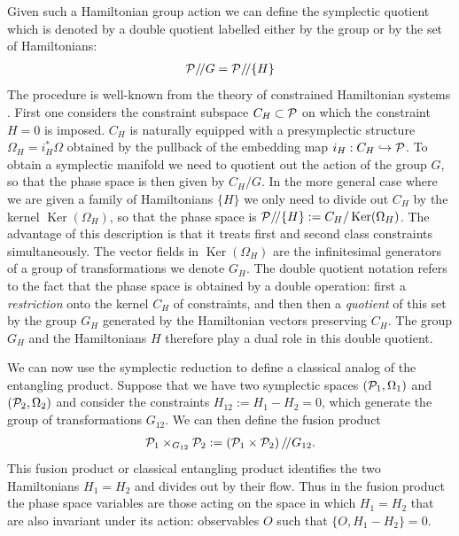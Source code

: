 \documentclass[a4paper,11pt]{article}
\newcommand{\beq}{\begin{eqnarray}}
\newcommand{\eeq}{\end{eqnarray}}
\DeclareMathOperator{\Ker}{Ker}
\begin{document}
Given such a Hamiltonian group action we can define the symplectic quotient which is denoted by a double quotient labelled either by the group or by the set of Hamiltonians:
\beq
{\cal P} /\!/ G = {\cal P} /\!/ \{H\}
\eeq
The procedure is well-known from the theory of constrained Hamiltonian systems \cite{Weinstein1979}. 
First one considers the constraint subspace $C_H \subset {\cal P}$ on which the constraint $H=0$ is imposed. 
$C_H$ is naturally equipped with a presymplectic structure $\Omega_H = i_H^*\Omega$ obtained by the pullback of the embedding  map $i_H: C_H \hookrightarrow {\cal P} $. 
To obtain a symplectic manifold we need to quotient out the action of the group $G$, so that the phase space is then given by $C_H/G$. 
In the more general case where we are given a family of Hamiltonians $\{ H \}$  we only need to divide out $C_H$ by the kernel $\Ker(\Omega_H)$, so that the phase space is ${\cal P} /\!/ \{H\}:= C_H/\Ker(\Omega_H)$. 
The advantage of this description is that it treats first and second class constraints simultaneously. 
The vector fields in $\Ker(\Omega_H)$ are the infinitesimal generators of a group of transformations we denote $G_H$. 
The double quotient notation refers to the fact that the phase space is obtained by a double operation: first a {\it restriction} onto the kernel $C_H$ of constraints, and then then a {\it quotient} of this set by the group $G_H$ generated by the Hamiltonian vectors preserving $C_H$. 
The group $G_H$ and the Hamiltonians $H$ therefore play a dual role in this double quotient.

We can now use the symplectic reduction to define a classical analog of the entangling product. Suppose that we have two symplectic spaces $({\cal P}_1,\Omega_1)$ and $({\cal P}_2,\Omega_2)$ and consider the constraints $H_{12} :=  H_1-H_2=0$, which generate the group of transformations $G_{12}$. 
We can then define the fusion product 
\beq
{\cal{P}}_1 \times_{G_{12}} {\cal{P}}_2 
:= \left({\cal{P}}_1 \times  {\cal{P}}_2\right)  /\!/ G_{12}.
\eeq 
This fusion product or classical entangling product identifies the two Hamiltonians $H_1 = H_2$ and divides out by their flow. 
Thus in the fusion product the phase space variables are those acting on the space in which $H_1=H_2$ that are also invariant under its action: observables $O$ such that $\{O,H_1-H_2\}=0$.
\end{document}
